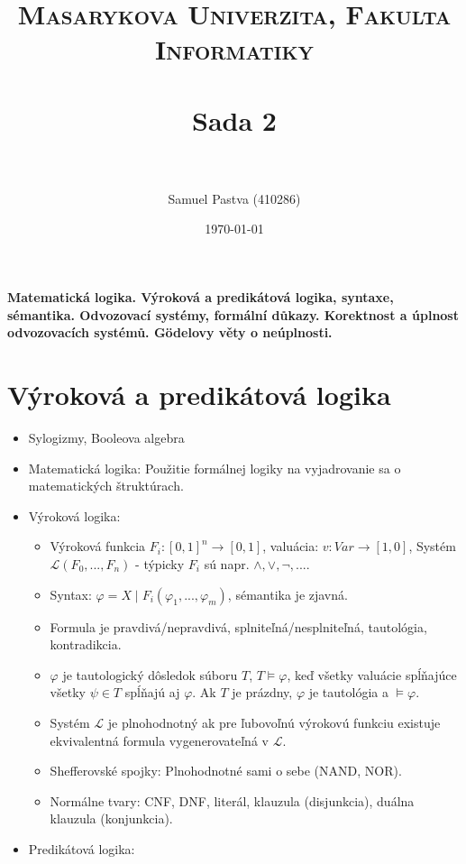 \documentclass[paper=a4, fontsize=11pt]{scrartcl} %
\title{	
	\normalfont \normalsize 
	\textsc{Masarykova Univerzita, Fakulta Informatiky} \\ [25pt] %
	\horrule{0.5pt} \\[0.4cm] %
	\huge Sada 2 \\ %
	\horrule{2pt} \\[0.5cm] %
}
\author{Samuel Pastva (410286)} %
\date{\normalsize\today} %
\numberwithin{equation}{section} %
\numberwithin{figure}{section} %
\numberwithin{table}{section} %
\begin{document}
	
	\textbf{Matematická logika. Výroková a predikátová logika, syntaxe, sémantika. Odvozovací systémy, formální důkazy. Korektnost a úplnost odvozovacích systémů. Gödelovy věty o neúplnosti.}
	
	\section{Výroková a predikátová logika}
	
	\begin{itemize}
		\item Sylogizmy, Booleova algebra
		\item Matematická logika: Použitie formálnej logiky na vyjadrovanie sa o matematických štruktúrach.
		\item Výroková logika:
		
		\begin{itemize}
			\item Výroková funkcia $F_i : [0,1]^n \to [0,1]$, valuácia: $v : Var \to [1,0]$, Systém $\mathcal{L}(F_0, ..., F_n)$ - týpicky $F_i$ sú napr. $\land, \lor, \lnot, ...$.
			\item Syntax: $\varphi = X \mid F_i(\varphi_1, ..., \varphi_m)$, sémantika je zjavná.
			\item Formula je pravdivá/nepravdivá, splniteľná/nesplniteľná, tautológia, kontradikcia.
			\item $\varphi$ je tautologický dôsledok súboru $T$, $T \models \varphi$, keď všetky valuácie spĺňajúce všetky $\psi \in T$ spĺňajú aj $\varphi$. Ak $T$ je prázdny, $\varphi$ je tautológia a $\models \varphi$.
			\item Systém $\mathcal{L}$ je plnohodnotný ak pre ľubovoľnú výrokovú funkciu existuje ekvivalentná formula vygenerovateľná v $\mathcal{L}$.
			\item Shefferovské spojky: Plnohodnotné sami o sebe (NAND, NOR).
			\item Normálne tvary: CNF, DNF, literál, klauzula (disjunkcia), duálna klauzula (konjunkcia). 
		\end{itemize}		
	
		\item Predikátová logika:
		

\end{itemize}
\end{document}
